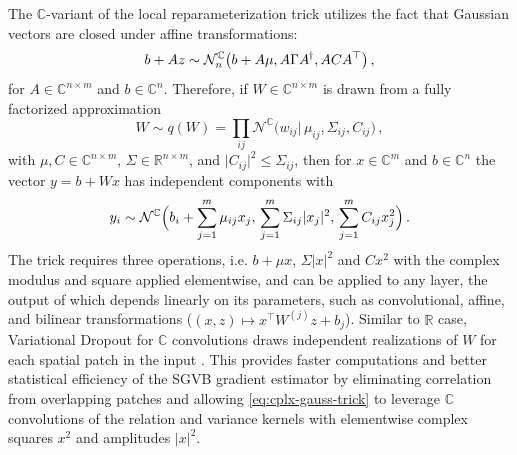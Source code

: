 \documentclass[a4paper,10pt,twocolumn]{article}
\newcommand{\real}{\mathbb{R}}
\newcommand{\cplx}{\mathbb{C}}
\newcommand{\hop}{{\mkern-1.5mu\dagger}}
\begin{document}
The $\cplx$-variant of the local reparameterization trick utilizes the fact that Gaussian
vectors are closed under affine transformations:
\begin{equation}  \label{eq:cn-affine}
  b + A z \sim \mathcal{N}_n^{\cplx}\bigl(
      b + A\mu, A \Gamma A^{\hop}, A C A^\top
    \bigr)
  \,,
\end{equation}
for $A \in \cplx^{n \times m}$ and $b \in \cplx^{n}$. Therefore, if $W \in \cplx^{n\times m}$
is drawn from a fully factorized approximation
\begin{equation}  \label{eq:c-gauss-vi-general}
  W \sim q(W)
    = \prod_{ij} \mathcal{N}^{\cplx} \bigl(
      w_{ij} \vert\, \mu_{ij}, \Sigma_{ij}, C_{ij}
    \bigr)
  \,,
\end{equation}
with $
  \mu, C \in \cplx^{n\times m}
$, $\Sigma \in \real^{n\times m}$, and $
  \lvert C_{ij} \rvert^2 \leq \Sigma_{ij}
$, then for $x \in \cplx^m$ and $b \in \cplx^n$ the vector $y = b + W x$ has independent
components with
\begin{equation}  \label{eq:cplx-gauss-trick}
  y_i
    \sim \mathcal{N}^{\cplx}
      \Bigl(
        b_i + \sum_{j=1}^m \mu_{ij} x_j,
        \, \sum_{j=1}^m \Sigma_{ij} \lvert x_j \rvert^2,
        \, \sum_{j=1}^m C_{ij} x_j^2
      \Bigr)
    \,.
\end{equation}
The trick requires three operations, i.e. $b + \mu x$, $\Sigma \lvert x \rvert^2$ and
$C x^2$ with the complex modulus and square applied elementwise, and can be applied to
any layer, the output of which depends linearly on its parameters, such as convolutional,
affine, and bilinear transformations ($
  (x, z) \mapsto x^\top W^{(j)} z + b_j
$). Similar to $\real$ case, Variational Dropout for $\cplx$ convolutions draws independent
realizations of $W$ for each spatial patch in the input \citep{molchanov_variational_2017}.
This provides faster computations and better statistical efficiency of the SGVB gradient
estimator by eliminating correlation from overlapping patches \citep{kingma_variational_2015}
and allowing \eqref{eq:cplx-gauss-trick} to leverage $\cplx$ convolutions of the relation
and variance kernels with elementwise complex squares $x^2$ and amplitudes $\lvert x \rvert^2$.
\end{document}
